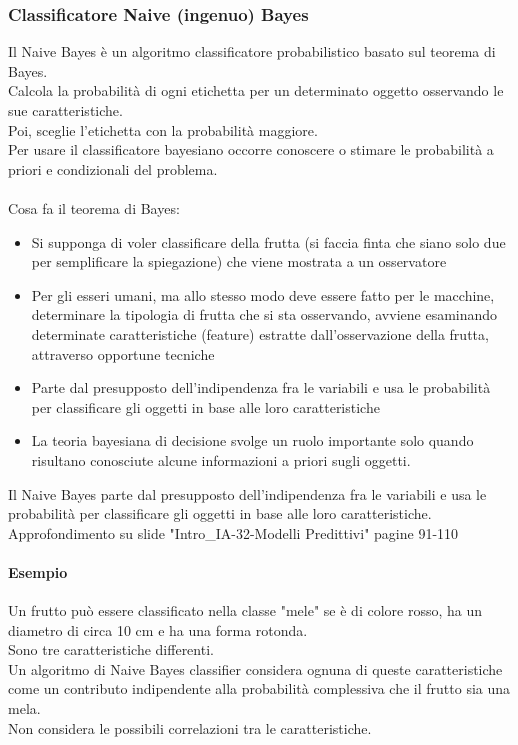 \documentclass[../main.tex]{subfiles}
\begin{document}
	\subsubsection{Classificatore Naive (ingenuo) Bayes}
	Il Naive Bayes è un algoritmo classificatore probabilistico basato sul teorema di Bayes. \\
	Calcola la probabilità di ogni etichetta per un determinato oggetto osservando le sue caratteristiche. \\
	Poi, sceglie l'etichetta con la probabilità maggiore. \\
	Per usare il classificatore bayesiano occorre conoscere o stimare le probabilità a priori e condizionali del problema.\\\\
	Cosa fa il teorema di Bayes:
	\begin{itemize}
		\item Si supponga di voler classificare della frutta (si faccia finta che siano solo due per semplificare la spiegazione) che viene mostrata a un osservatore
		\item Per gli esseri umani, ma allo stesso modo deve essere fatto per le macchine, determinare la tipologia di frutta che si sta osservando, avviene esaminando determinate caratteristiche (feature) estratte dall'osservazione della frutta, attraverso opportune tecniche
		\item Parte dal presupposto dell'indipendenza fra le variabili e usa le probabilità per classificare gli oggetti in base alle loro caratteristiche
		\item La teoria bayesiana di decisione svolge un ruolo importante solo quando risultano conosciute alcune informazioni a priori sugli oggetti.
	\end{itemize}
	Il Naive Bayes parte dal presupposto dell'indipendenza fra le variabili e usa le probabilità per classificare gli oggetti in base alle loro caratteristiche.\\
	{\color{red}Approfondimento su slide "Intro\_IA-32-Modelli Predittivi" pagine 91-110}
	\paragraph{Esempio} 
	Un frutto può essere classificato nella classe "mele" se è di colore rosso, ha un diametro di circa 10 cm e ha una forma rotonda. \\
	Sono tre caratteristiche differenti. \\
	Un algoritmo di Naive Bayes classifier considera ognuna di queste caratteristiche come un contributo indipendente alla probabilità complessiva che il frutto sia una mela. \\
	Non considera le possibili correlazioni tra le caratteristiche.
\end{document}
